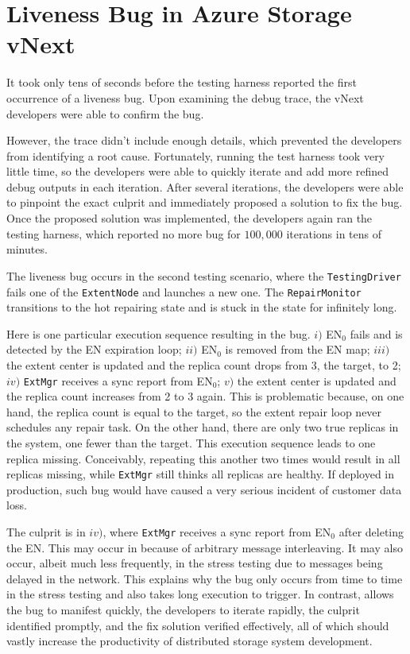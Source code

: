 \section{Liveness Bug in Azure Storage vNext}
\label{sec:cases:azurestore}

It took only tens of seconds before the testing harness reported the first occurrence of a liveness bug. Upon examining the debug trace, the vNext developers were able to confirm the bug.

However, the trace didn't include enough details, which prevented the developers from identifying a root cause. Fortunately, running the test harness took very little time, so the developers were able to quickly iterate and add more refined debug outputs in each iteration. After several iterations, the developers were able to pinpoint the exact culprit and immediately proposed a solution to fix the bug. Once the proposed solution was implemented, the developers again ran the testing harness, which reported no more bug for $100,000$ iterations in tens of minutes.

The liveness bug occurs in the second testing scenario, where the \texttt{TestingDriver} fails one of the \texttt{ExtentNode} and launches a new one. The \texttt{RepairMonitor} transitions to the hot repairing state and is stuck in the state for infinitely long.

Here is one particular execution sequence resulting in the bug. $i)$ EN$_0$ fails and is detected by the EN expiration loop; $ii)$ EN$_0$ is removed from the EN map; $iii)$ the extent center is updated and the replica count drops from 3, the target, to 2; $iv)$ \texttt{ExtMgr} receives a sync report from EN$_0$; $v)$ the extent center is updated and the replica count increases from 2 to 3 again. This is problematic because, on one hand, the replica count is equal to the target, so the extent repair loop never schedules any repair task. On the other hand, there are only two true replicas in the system, one fewer than the target. This execution sequence leads to one replica missing. Conceivably, repeating this another two times would result in all replicas missing, while \texttt{ExtMgr} still thinks all replicas are healthy. If deployed in production, such bug would have caused a very serious incident of customer data loss.

The culprit is in $iv)$, where \texttt{ExtMgr} receives a sync report from EN$_0$ after deleting the EN. This may occur in \psharp because of arbitrary message interleaving. It may also occur, albeit much less frequently, in the stress testing due to messages being delayed in the network. This explains why the bug only occurs from time to time in the stress testing and also takes long execution to trigger. In contrast, \psharp allows the bug to manifest quickly, the developers to iterate rapidly, the culprit identified promptly, and the fix solution verified effectively, all of which should vastly increase the productivity of distributed storage system development. 


